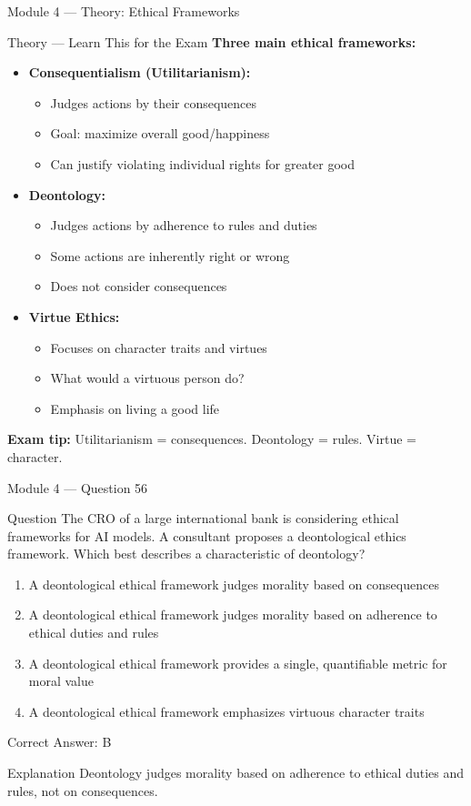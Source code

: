 \documentclass[aspectratio=169,10pt]{beamer}
\newcommand{\question}[1]{%
	\begin{block}{Question}
		#1
	\end{block}
}
\newcommand{\options}[4]{%
	\begin{enumerate}[label=\Alph*.,leftmargin=*]
		\item #1
		\item #2
		\item #3
		\item #4
	\end{enumerate}
}
\newcommand{\answerbox}[1]{%
	\begin{exampleblock}{Correct Answer: #1}
	\end{exampleblock}
}
\newcommand{\explain}[1]{%
	\begin{block}{Explanation}
		\small #1
	\end{block}
}
\newcommand{\theory}[1]{%
	\begin{block}{Theory --- Learn This for the Exam}
		\small #1
	\end{block}
}
\begin{document}
	\begin{frame}{Module 4 --- Theory: Ethical Frameworks}
		\theory{
			\textbf{Three main ethical frameworks:}
			\begin{itemize}
				\item \textbf{Consequentialism (Utilitarianism):}
				\begin{itemize}
					\item Judges actions by their consequences
					\item Goal: maximize overall good/happiness
					\item Can justify violating individual rights for greater good
				\end{itemize}
				\item \textbf{Deontology:}
				\begin{itemize}
					\item Judges actions by adherence to rules and duties
					\item Some actions are inherently right or wrong
					\item Does not consider consequences
				\end{itemize}
				\item \textbf{Virtue Ethics:}
				\begin{itemize}
					\item Focuses on character traits and virtues
					\item What would a virtuous person do?
					\item Emphasis on living a good life
				\end{itemize}
			\end{itemize}
			\textbf{Exam tip:} Utilitarianism = consequences. Deontology = rules. Virtue = character.
		}
	\end{frame}
	
	\begin{frame}{Module 4 --- Question 56}
		\question{The CRO of a large international bank is considering ethical frameworks for AI models. A consultant proposes a deontological ethics framework. Which best describes a characteristic of deontology?}
		\options{A deontological ethical framework judges morality based on consequences}{A deontological ethical framework judges morality based on adherence to ethical duties and rules}{A deontological ethical framework provides a single, quantifiable metric for moral value}{A deontological ethical framework emphasizes virtuous character traits}
		\answerbox{B}
		\explain{Deontology judges morality based on adherence to ethical duties and rules, not on consequences.}
	\end{frame}
	
\end{document}
